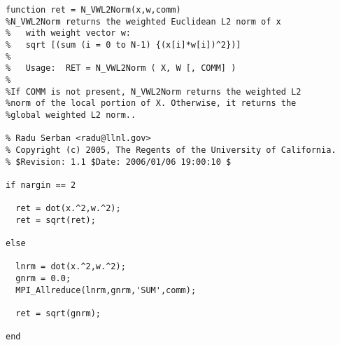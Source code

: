 \begin{lstlisting}[linerange={1-1,11-30}]
function ret = N_VWL2Norm(x,w,comm)
%N_VWL2Norm returns the weighted Euclidean L2 norm of x 
%   with weight vector w:
%   sqrt [(sum (i = 0 to N-1) {(x[i]*w[i])^2})]
%
%   Usage:  RET = N_VWL2Norm ( X, W [, COMM] )
%
%If COMM is not present, N_VWL2Norm returns the weighted L2
%norm of the local portion of X. Otherwise, it returns the 
%global weighted L2 norm..

% Radu Serban <radu@llnl.gov>
% Copyright (c) 2005, The Regents of the University of California.
% $Revision: 1.1 $Date: 2006/01/06 19:00:10 $

if nargin == 2
  
  ret = dot(x.^2,w.^2);
  ret = sqrt(ret);
  
else
  
  lnrm = dot(x.^2,w.^2);
  gnrm = 0.0;
  MPI_Allreduce(lnrm,gnrm,'SUM',comm);
  
  ret = sqrt(gnrm);
  
end\end{lstlisting}
